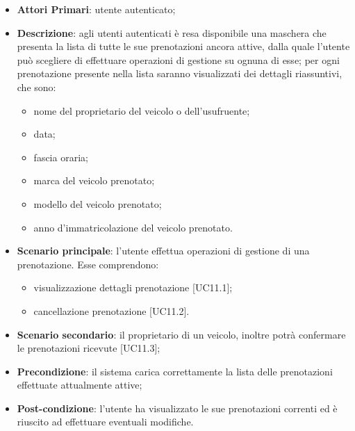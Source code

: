 \begin{itemize}
	\item \textbf{Attori Primari}: utente autenticato;
	\item \textbf{Descrizione}: agli utenti autenticati è resa disponibile una maschera che presenta la lista di tutte le sue prenotazioni ancora attive, dalla quale l'utente può scegliere di effettuare operazioni di gestione su ognuna di esse;
	per ogni prenotazione presente nella lista saranno visualizzati dei dettagli riassuntivi, che sono:
	\begin{itemize}
		\item nome del proprietario del veicolo o dell'usufruente;
		\item data;
		\item fascia oraria;
		\item marca del veicolo prenotato;
		\item modello del veicolo prenotato;
		\item anno d'immatricolazione del veicolo prenotato.
	\end{itemize}
	\item \textbf{Scenario principale}: l'utente effettua operazioni di gestione di una prenotazione. Esse comprendono:
	\begin{itemize}
		\item visualizzazione dettagli prenotazione [UC11.1];
		\item cancellazione prenotazione [UC11.2].
	\end{itemize}
	\item \textbf{Scenario secondario}: il proprietario di un veicolo, inoltre potrà confermare le prenotazioni ricevute [UC11.3];
	\item \textbf{Precondizione}: il sistema carica correttamente la lista delle prenotazioni effettuate attualmente attive;
	\item \textbf{Post-condizione}: l'utente ha visualizzato le sue prenotazioni correnti ed è riuscito ad effettuare eventuali modifiche.
\end{itemize} 
